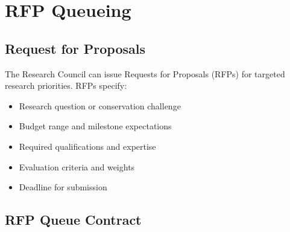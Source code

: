 \documentclass[11pt,letterpaper]{article}
\begin{document}
\section{RFP Queueing}
\label{sec:rfp}

\subsection{Request for Proposals}

The Research Council can issue Requests for Proposals (RFPs) for targeted research priorities. RFPs specify:

\begin{itemize}
    \item Research question or conservation challenge
    \item Budget range and milestone expectations
    \item Required qualifications and expertise
    \item Evaluation criteria and weights
    \item Deadline for submission
\end{itemize}

\subsection{RFP Queue Contract}
\end{document}
